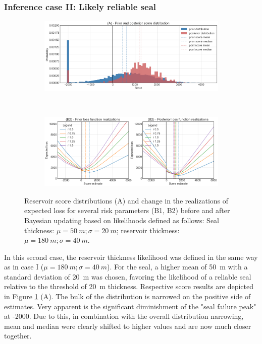				\subsubsection{Inference case II: Likely reliable seal}
				\begin{figure}[h]
					\begin{subfigure}{1\textwidth}
						\centering
						\includegraphics[width=1\linewidth]{Figures/update_goodseal2.png}
					\end{subfigure}%
					\\
					\begin{subfigure}{1\textwidth}
						\centering
						\includegraphics[width=1\linewidth]{Figures/update_goodseal3.png}
					\end{subfigure}
					\caption{Reservoir score distributions (A) and change in the realizations of expected loss for several risk parameters (B1, B2) before and after Bayesian updating based on likelihoods defined as follows: Seal thickness: $\mu = 50~m; \sigma = 20~m$; reservoir thickness: $\mu = 180~m; \sigma = 40~m$.}
					\label{fig:update_goodseal2_3}
				\end{figure}
				In this second case, the reservoir thickness likelihood was defined in the same way as in case I ($\mu = 180~m; \sigma = 40~m$). For the seal, a higher mean of 50~m with a standard deviation of 20~m was chosen, favoring the likelihood of a reliable seal relative to the threshold of 20~m thickness. Respective score results are depicted in Figure \ref{fig:update_goodseal2_3} (A). The bulk of the distribution is narrowed on the positive side of estimates. Very apparent is the significant diminishment of the "seal failure peak" at -2000. Due to this, in combination with the overall distribution narrowing, mean and median were clearly shifted to higher values and are now much closer together.\\	
